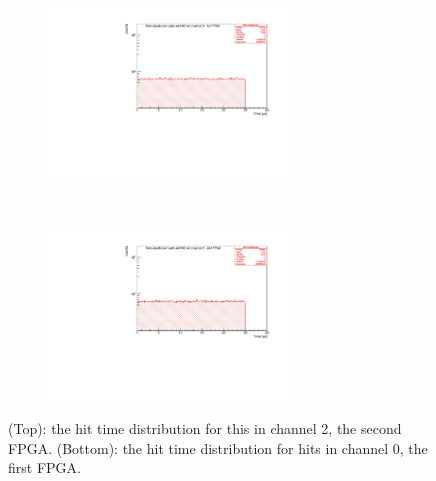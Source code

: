 \begin{figure}[!h]
  \begin{subfigure}[b]{\textwidth}
      \centering
      \includegraphics[width=0.7\textwidth]{figures/pdf/figure_00001_timedistr_roc_simulation_10538.pdf}
      \label{fig:ttt1}
  \end{subfigure}
\\
  \begin{subfigure}[b]{\textwidth}
      \centering
      \includegraphics[width=0.7\textwidth]{figures/pdf/figure_00012_timedistr_roc_simulation_ch2_105038.pdf}
      \label{fig:ttt2}
  \end{subfigure}
     \caption{(Top): the hit time distribution for this in channel 2, the second FPGA. 
     (Bottom): the hit time distribution for hits in channel 0, the first FPGA.}
     \label{fig:4}
\end{figure}


